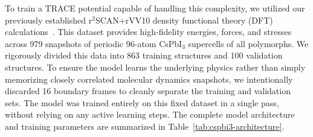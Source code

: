 \documentclass[aps,prx,preprint,notitlepage,superscriptaddress,nofootinbib,floatfix]{revtex4-2}
\begin{document}
To train a TRACE potential capable of handling this complexity, we utilized our previously established r$^2$SCAN+rVV10 density functional theory (DFT) calculations~\cite{ahlawat2024crystallization}. This dataset provides high-fidelity energies, forces, and stresses across 979 snapshots of periodic 96-atom CsPbI$_3$ supercells of all polymorphs. We rigorously divided this data into 863 training structures and 100 validation structures. To ensure the model learns the underlying physics rather than simply memorizing closely correlated molecular dynamics snapshots, we intentionally discarded 16 boundary frames to cleanly separate the training and validation sets. The model was trained entirely on this fixed dataset in a single pass, without relying on any active learning steps. The complete model architecture and training parameters are summarized in Table~\ref{tab:cspbi3-architecture}.
\end{document}
